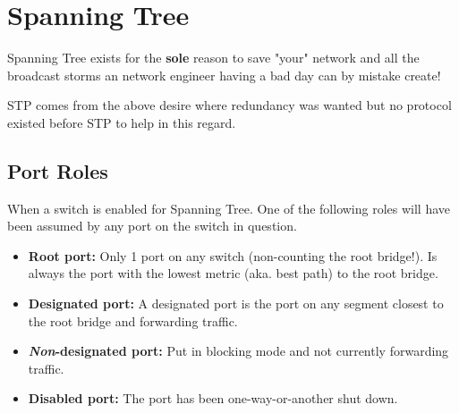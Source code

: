 \section{Spanning Tree}

Spanning Tree exists for the \textbf{sole} reason to save "your" network and all the broadcast storms an network engineer having a bad day can by mistake create!

STP comes from the above desire where redundancy was wanted but no protocol existed before STP to help in this regard.

\begin{table}[h]
	\centering
	\caption{Spanning Tree standrds}
	\label{stpstandards}
\end{table}

\subsection{Port Roles}

When a switch is enabled for Spanning Tree. One of the following roles will have been assumed by any port on the switch in question.

\begin{itemize}
	\item \textbf{Root port:} Only 1 port on any switch (non-counting the root bridge!). Is always the port with the lowest metric (aka. best path) to the root bridge.
	\item \textbf{Designated port:} A designated port is the port on any segment closest to the root bridge and forwarding traffic.
	\item \textbf{\textit{Non}-designated port:} Put in blocking mode and not currently forwarding traffic.
	\item \textbf{Disabled port:} The port has been one-way-or-another shut down.
\end{itemize}

